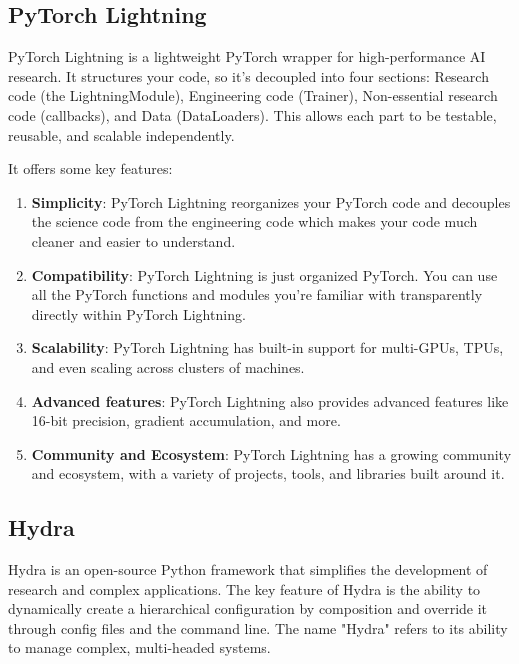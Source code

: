 \subsection{PyTorch Lightning}
PyTorch Lightning is a lightweight PyTorch wrapper for high-performance AI research. It structures your code, so it's decoupled into four sections: Research code (the LightningModule), Engineering code (Trainer), Non-essential research code (callbacks), and Data (DataLoaders). This allows each part to be testable, reusable, and scalable independently.

It offers some key features:
\begin{enumerate}
    \item \textbf{Simplicity}: PyTorch Lightning reorganizes your PyTorch code and decouples the science code from the engineering code which makes your code much cleaner and easier to understand.
    \item \textbf{Compatibility}: PyTorch Lightning is just organized PyTorch. You can use all the PyTorch functions and modules you're familiar with transparently directly within PyTorch Lightning.
    \item \textbf{Scalability}: PyTorch Lightning has built-in support for multi-GPUs, TPUs, and even scaling across clusters of machines.
    \item \textbf{Advanced features}: PyTorch Lightning also provides advanced features like 16-bit precision, gradient accumulation, and more.
    \item \textbf{Community and Ecosystem}: PyTorch Lightning has a growing community and ecosystem, with a variety of projects, tools, and libraries built around it.
\end{enumerate}

\subsection{Hydra}
Hydra is an open-source Python framework that simplifies the development of research and complex applications. The key feature of Hydra is the ability to dynamically create a hierarchical configuration by composition and override it through config files and the command line. The name "Hydra" refers to its ability to manage complex, multi-headed systems.

